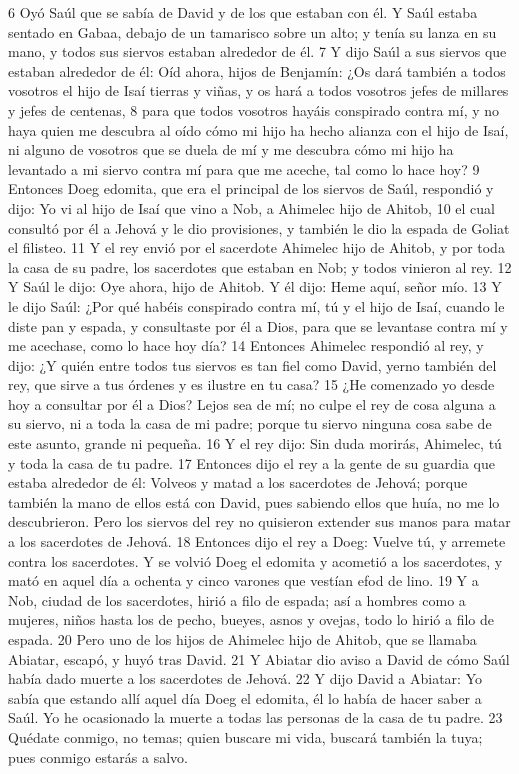 6 Oyó Saúl que se sabía de David y de los que estaban con él. Y Saúl estaba sentado en Gabaa, debajo de un tamarisco sobre un alto; y tenía su lanza en su mano, y todos sus siervos estaban alrededor de él.
7 Y dijo Saúl a sus siervos que estaban alrededor de él: Oíd ahora, hijos de Benjamín: ¿Os dará también a todos vosotros el hijo de Isaí tierras y viñas, y os hará a todos vosotros jefes de millares y jefes de centenas,
8 para que todos vosotros hayáis conspirado contra mí, y no haya quien me descubra al oído cómo mi hijo ha hecho alianza con el hijo de Isaí, ni alguno de vosotros que se duela de mí y me descubra cómo mi hijo ha levantado a mi siervo contra mí para que me aceche, tal como lo hace hoy?
9 Entonces Doeg edomita, que era el principal de los siervos de Saúl, respondió y dijo: Yo vi al hijo de Isaí que vino a Nob, a Ahimelec hijo de Ahitob,
10 el cual consultó por él a Jehová y le dio provisiones, y también le dio la espada de Goliat el filisteo. 
11 Y el rey envió por el sacerdote Ahimelec hijo de Ahitob, y por toda la casa de su padre, los sacerdotes que estaban en Nob; y todos vinieron al rey.
12 Y Saúl le dijo: Oye ahora, hijo de Ahitob. Y él dijo: Heme aquí, señor mío.
13 Y le dijo Saúl: ¿Por qué habéis conspirado contra mí, tú y el hijo de Isaí, cuando le diste pan y espada, y consultaste por él a Dios, para que se levantase contra mí y me acechase, como lo hace hoy día?
14 Entonces Ahimelec respondió al rey, y dijo: ¿Y quién entre todos tus siervos es tan fiel como David, yerno también del rey, que sirve a tus órdenes y es ilustre en tu casa?
15 ¿He comenzado yo desde hoy a consultar por él a Dios? Lejos sea de mí; no culpe el rey de cosa alguna a su siervo, ni a toda la casa de mi padre; porque tu siervo ninguna cosa sabe de este asunto, grande ni pequeña.
16 Y el rey dijo: Sin duda morirás, Ahimelec, tú y toda la casa de tu padre.
17 Entonces dijo el rey a la gente de su guardia que estaba alrededor de él: Volveos y matad a los sacerdotes de Jehová; porque también la mano de ellos está con David, pues sabiendo ellos que huía, no me lo descubrieron. Pero los siervos del rey no quisieron extender sus manos para matar a los sacerdotes de Jehová.
18 Entonces dijo el rey a Doeg: Vuelve tú, y arremete contra los sacerdotes. Y se volvió Doeg el edomita y acometió a los sacerdotes, y mató en aquel día a ochenta y cinco varones que vestían efod de lino.
19 Y a Nob, ciudad de los sacerdotes, hirió a filo de espada; así a hombres como a mujeres, niños hasta los de pecho, bueyes, asnos y ovejas, todo lo hirió a filo de espada.
20 Pero uno de los hijos de Ahimelec hijo de Ahitob, que se llamaba Abiatar, escapó, y huyó tras David.
21 Y Abiatar dio aviso a David de cómo Saúl había dado muerte a los sacerdotes de Jehová.
22 Y dijo David a Abiatar: Yo sabía que estando allí aquel día Doeg el edomita, él lo había de hacer saber a Saúl. Yo he ocasionado la muerte a todas las personas de la casa de tu padre.
23 Quédate conmigo, no temas; quien buscare mi vida, buscará también la tuya; pues conmigo estarás a salvo.

